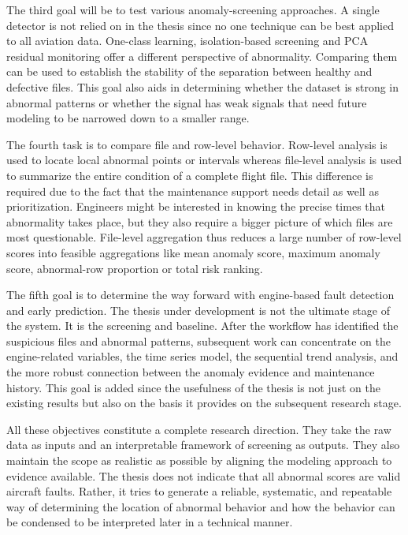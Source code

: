 \documentclass[12pt,a4paper]{report}
\begin{document}
	The third goal will be to test various anomaly-screening approaches. A single detector is not relied on in the thesis since no one technique can be best applied to all aviation data. One-class learning, isolation-based screening and PCA residual monitoring offer a different perspective of abnormality. Comparing them can be used to establish the stability of the separation between healthy and defective files. This goal also aids in determining whether the dataset is strong in abnormal patterns or whether the signal has weak signals that need future modeling to be narrowed down to a smaller range.
	
	The fourth task is to compare file and row-level behavior. Row-level analysis is used to locate local abnormal points or intervals whereas file-level analysis is used to summarize the entire condition of a complete flight file. This difference is required due to the fact that the maintenance support needs detail as well as prioritization. Engineers might be interested in knowing the precise times that abnormality takes place, but they also require a bigger picture of which files are most questionable. File-level aggregation thus reduces a large number of row-level scores into feasible aggregations like mean anomaly score, maximum anomaly score, abnormal-row proportion or total risk ranking.
	
	The fifth goal is to determine the way forward with engine-based fault detection and early prediction. The thesis under development is not the ultimate stage of the system. It is the screening and baseline. After the workflow has identified the suspicious files and abnormal patterns, subsequent work can concentrate on the engine-related variables, the time series model, the sequential trend analysis, and the more robust connection between the anomaly evidence and maintenance history. This goal is added since the usefulness of the thesis is not just on the existing results but also on the basis it provides on the subsequent research stage.
	
	All these objectives constitute a complete research direction. They take the raw data as inputs and an interpretable framework of screening as outputs. They also maintain the scope as realistic as possible by aligning the modeling approach to evidence available. The thesis does not indicate that all abnormal scores are valid aircraft faults. Rather, it tries to generate a reliable, systematic, and repeatable way of determining the location of abnormal behavior and how the behavior can be condensed to be interpreted later in a technical manner.
	
\end{document}
